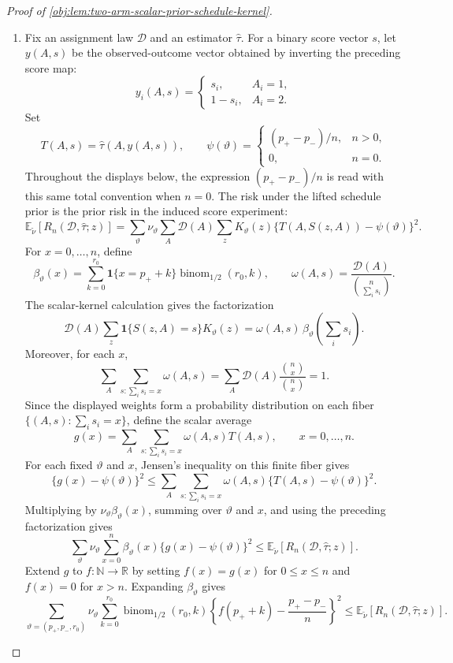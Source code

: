 \begin{proof}[Proof of \cref{obj:lem:two-arm-scalar-prior-schedule-kernel}]
\begin{enumerate}
\item Fix an assignment law \(\mathcal D\) and an estimator \(\widehat\tau\).  For a binary score vector \(s\), let \(y(A,s)\) be the observed-outcome vector obtained by inverting the preceding score map:
\[
y_i(A,s)=
\begin{cases}
s_i,&A_i=1,\\
1-s_i,&A_i=2.
\end{cases}
\]
Set
\[
T(A,s)=\widehat\tau(A,y(A,s)),
\qquad
\psi(\vartheta)=
\begin{cases}
(p_+-p_-)/n,& n>0,\\
0,& n=0.
\end{cases}
\]
Throughout the displays below, the expression \((p_+-p_-)/n\) is read with this same total convention when \(n=0\).  The risk under the lifted schedule prior is the prior risk in the induced score experiment:
\[
\mathbb E_{\widetilde\nu}\!\left[R_n(\mathcal D,\widehat\tau;z)\right]
=
\sum_\vartheta \nu_\vartheta
\sum_A \mathcal D(A)
\sum_z K_\vartheta(z)\{T(A,S(z,A))-\psi(\vartheta)\}^2 .
\]
For \(x=0,\ldots,n\), define
\[
\beta_\vartheta(x)=
\sum_{k=0}^{r_0}\mathbf 1\{x=p_+ + k\}\operatorname{binom}_{1/2}(r_0,k),
\qquad
\omega(A,s)=\frac{\mathcal D(A)}{\binom n{\sum_i s_i}}.
\]
The scalar-kernel calculation gives the factorization
\[
\mathcal D(A)
\sum_z \mathbf 1\{S(z,A)=s\}K_\vartheta(z)
=
\omega(A,s)\,\beta_\vartheta\!\left(\sum_i s_i\right).
\]
Moreover, for each \(x\),
\[
\sum_{A}\sum_{s:\sum_i s_i=x}\omega(A,s)
=
\sum_A\mathcal D(A)\frac{\binom n x}{\binom n x}
=
1.
\]
Since the displayed weights form a probability distribution on each fiber \(\{(A,s):\sum_i s_i=x\}\), define the scalar average
\[
g(x)=
\sum_A\sum_{s:\sum_i s_i=x}
\omega(A,s)T(A,s),
\qquad x=0,\ldots,n .
\]
For each fixed \(\vartheta\) and \(x\), Jensen's inequality on this finite fiber gives
\[
\{g(x)-\psi(\vartheta)\}^2
\le
\sum_A\sum_{s:\sum_i s_i=x}
\omega(A,s)\{T(A,s)-\psi(\vartheta)\}^2 .
\]
Multiplying by \(\nu_\vartheta\beta_\vartheta(x)\), summing over \(\vartheta\) and \(x\), and using the preceding factorization gives
\[
\sum_\vartheta\nu_\vartheta
\sum_{x=0}^n
\beta_\vartheta(x)\{g(x)-\psi(\vartheta)\}^2
\le
\mathbb E_{\widetilde\nu}\!\left[R_n(\mathcal D,\widehat\tau;z)\right].
\]  Extend \(g\) to \(f:\mathbb N\to\mathbb R\) by setting \(f(x)=g(x)\) for \(0\le x\le n\) and \(f(x)=0\) for \(x>n\).  Expanding \(\beta_\vartheta\) gives
\[
\sum_{\vartheta=(p_+,p_-,r_0)}
\nu_\vartheta
\sum_{k=0}^{r_0}
\operatorname{binom}_{1/2}(r_0,k)
\left\{
f(p_+ + k)-\frac{p_+-p_-}{n}
\right\}^2
\le
\mathbb E_{\widetilde\nu}\!\left[
R_n(\mathcal D,\widehat\tau;z)
\right].
\] %


\end{enumerate}
\end{proof}
